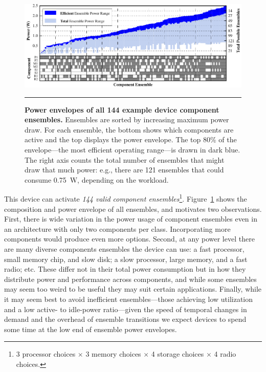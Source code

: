 \begin{figure}[t]
\includegraphics{./figures/componentgraph.pdf}

\caption{\small \textbf{Power envelopes of all 144 example device component
ensembles.} Ensembles are sorted by increasing maximum power draw. For each
ensemble, the bottom shows which components are active and the top displays
the power envelope. The top 80\% of the envelope---the most efficient
operating range---is drawn in dark blue. The right axis counts the total
number of ensembles that might draw that much power: e.g., there are 121
ensembles that could consume 0.75~W, depending on the workload.}

\vspace{0.10in}
\hrule
\vspace{-0.20in}
\label{figure-componentgraph}
\end{figure}


This device can activate \textit{144 valid component ensembles}\footnote{3
processor choices $\times$ 3 memory choices $\times$ 4 storage choices
$\times$ 4 radio choices.}. Figure~\ref{figure-componentgraph} shows the
composition and power envelope of all ensembles, and motivates two
observations. First, there is wide variation in the power usage of component
ensembles even in an architecture with only two components per class.
Incorporating more components would produce even more options. Second, at any
power level there are many diverse components ensembles the device can use: a
fast processor, small memory chip, and slow disk; a slow processor, large
memory, and a fast radio; etc. These differ not in their total power
consumption but in how they distribute power and performance across
components, and while some ensembles may seem too weird to be useful they may
suit certain applications. Finally, while it may seem best to avoid
inefficient ensembles---those achieving low utilization and a low active- to
idle-power ratio---given the speed of temporal changes in demand and the
overhead of ensemble transitions we expect devices to spend some time at the
low end of ensemble power envelopes.

